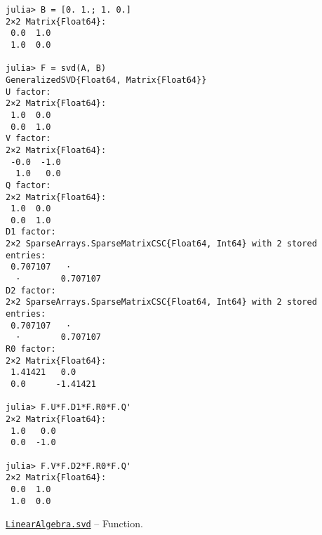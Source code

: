 \begin{adjustwidth}{2em}{0pt}
\begin{verbatim}
julia> B = [0. 1.; 1. 0.]
2×2 Matrix{Float64}:
 0.0  1.0
 1.0  0.0

julia> F = svd(A, B)
GeneralizedSVD{Float64, Matrix{Float64}}
U factor:
2×2 Matrix{Float64}:
 1.0  0.0
 0.0  1.0
V factor:
2×2 Matrix{Float64}:
 -0.0  -1.0
  1.0   0.0
Q factor:
2×2 Matrix{Float64}:
 1.0  0.0
 0.0  1.0
D1 factor:
2×2 SparseArrays.SparseMatrixCSC{Float64, Int64} with 2 stored entries:
 0.707107   ⋅
  ⋅        0.707107
D2 factor:
2×2 SparseArrays.SparseMatrixCSC{Float64, Int64} with 2 stored entries:
 0.707107   ⋅
  ⋅        0.707107
R0 factor:
2×2 Matrix{Float64}:
 1.41421   0.0
 0.0      -1.41421

julia> F.U*F.D1*F.R0*F.Q'
2×2 Matrix{Float64}:
 1.0   0.0
 0.0  -1.0

julia> F.V*F.D2*F.R0*F.Q'
2×2 Matrix{Float64}:
 0.0  1.0
 1.0  0.0
\end{verbatim}



\end{adjustwidth}
\hypertarget{6661056220970412040}{}
\hyperlink{6661056220970412040}{\texttt{LinearAlgebra.svd}}  -- {Function.}

